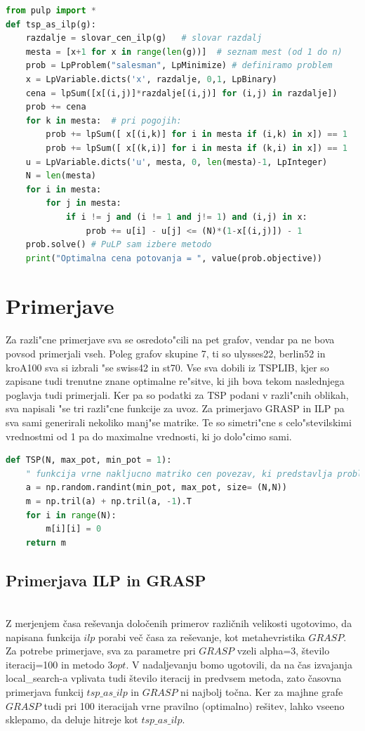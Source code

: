 \documentclass[12pt,a4paper]{amsart}
\theoremstyle{definition} %
\theoremstyle{plain} %
\begin{document}
\begin{lstlisting}[language=Python]
from pulp import *
def tsp_as_ilp(g):
    razdalje = slovar_cen_ilp(g)   # slovar razdalj 
    mesta = [x+1 for x in range(len(g))]  # seznam mest (od 1 do n)
    prob = LpProblem("salesman", LpMinimize) # definiramo problem
    x = LpVariable.dicts('x', razdalje, 0,1, LpBinary) 
    cena = lpSum([x[(i,j)]*razdalje[(i,j)] for (i,j) in razdalje]) 
    prob += cena
    for k in mesta:  # pri pogojih:
        prob += lpSum([ x[(i,k)] for i in mesta if (i,k) in x]) == 1  
        prob += lpSum([ x[(k,i)] for i in mesta if (k,i) in x]) == 1  
    u = LpVariable.dicts('u', mesta, 0, len(mesta)-1, LpInteger) 
    N = len(mesta)
    for i in mesta:  
        for j in mesta:
            if i != j and (i != 1 and j!= 1) and (i,j) in x:
                prob += u[i] - u[j] <= (N)*(1-x[(i,j)]) - 1
    prob.solve() # PuLP sam izbere metodo
    print("Optimalna cena potovanja = ", value(prob.objective))   
\end{lstlisting}



\section{Primerjave}
Za razli"cne primerjave sva se osredoto"cili na pet grafov, vendar pa ne bova povsod primerjali vseh. Poleg grafov skupine 7, ti so ulysses22, berlin52 in kroA100 sva si izbrali "se swiss42 in st70. Vse sva dobili iz TSPLIB, kjer so zapisane tudi trenutne znane optimalne re"sitve, ki jih bova tekom naslednjega poglavja tudi primerjali. Ker pa so podatki za TSP podani v razli"cnih oblikah, sva napisali "se tri razli"cne funkcije za uvoz. Za primerjavo GRASP in ILP pa sva sami generirali nekoliko manj"se matrike. Te so simetri"cne s celo"stevilskimi vrednostmi od 1 pa do maximalne vrednosti, ki jo dolo"cimo sami. 

\begin{lstlisting}[language=Python]
def TSP(N, max_pot, min_pot = 1):
    " funkcija vrne nakljucno matriko cen povezav, ki predstavlja problem potujocega trgovca"
    a = np.random.randint(min_pot, max_pot, size= (N,N))
    m = np.tril(a) + np.tril(a, -1).T
    for i in range(N):
        m[i][i] = 0
    return m
\end{lstlisting}

\subsection{Primerjava ILP in GRASP} ~\\
Z merjenjem časa reševanja določenih primerov različnih velikosti ugotovimo, da napisana funkcija $ilp$ porabi več časa za reševanje, kot metahevristika $GRASP$. Za potrebe primerjave, sva za parametre pri $GRASP$ vzeli alpha=3, število iteracij=100 in metodo $3opt$. 
V nadaljevanju bomo ugotovili, da na čas izvajanja local\_search-a vplivata tudi število iteracij in predvsem metoda, zato časovna primerjava funkcij $ tsp\_as\_ilp$ in $GRASP$ ni najbolj točna. Ker za majhne grafe $GRASP$ tudi pri 100 iteracijah vrne pravilno (optimalno) rešitev,
lahko vseeno sklepamo, da deluje hitreje kot $ tsp\_as\_ilp$. 
\end{document}
